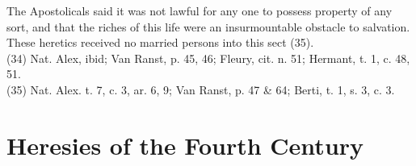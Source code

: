 \documentclass[12pt]{book}
\begin{document}
The Apostolicals said it was not lawful for any one to possess property of any sort, and that the riches of
this life were an insurmountable obstacle to salvation. These heretics received no married persons into
this sect (35).\\
(34) Nat. Alex, ibid; Van Ranst, p. 45, 46; Fleury, cit. n. 51; Hermant, t. 1, c. 48, 51. \\
(35) Nat. Alex. t. 7, c. 3, ar. 6, 9; Van Ranst, p. 47 \& 64; Berti, t. 1, s. 3, c. 3.

\chapter{Heresies of the Fourth Century}
\end{document}
